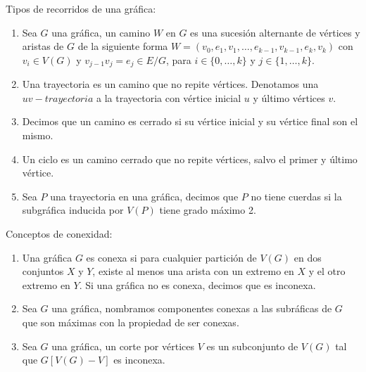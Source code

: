 \begin{definicion} Tipos de recorridos de una gr\'afica:
    \label{def:tipos de recorridos}
    \begin{enumerate}
        \item Sea $G$ una gr\'afica, un camino $W$ en $G$ es una sucesi\'on
        alternante de v\'ertices y aristas de $G$ de la siguiente forma
        $W=(v_0, e_1,v_1, \dots, e_{k-1},v_{k-1}, e_k,v_k)$ con $v_i \in
        V(G)$ y $v_{j-1}v_j = e_j \in E/G$, para $i \in \{0, \dots, k\}$ y
        $j \in \{ 1, \dots, k\}$.
        \item Una trayectoria es un camino que no repite v\'ertices.
        Denotamos una $uv-\textit{trayectoria}$ a la trayectoria con
        v\'ertice inicial $u$ y \'ultimo v\'ertices $v$.
        \item Decimos que un camino es cerrado si su v\'ertice inicial y su
        v\'ertice final son el mismo.
        \item Un ciclo es un camino cerrado que no repite v\'ertices, salvo
        el primer y \'ultimo v\'ertice.
        \item Sea $P$ una trayectoria en una gr\'afica, decimos que $P$ no
        tiene cuerdas si la subgr\'afica inducida por $V(P)$ tiene grado
        m\'aximo 2.
    \end{enumerate}
\end{definicion}

\begin{definicion} Conceptos de conexidad:
    \label{def:conexidad}
    \begin{enumerate}    
        \item Una gr\'afica $G$ es conexa si para cualquier partici\'on de
        $V(G)$ en dos conjuntos $X$ y $Y$, existe al menos una arista con un
        extremo en $X$ y el otro extremo en $Y$. Si una gr\'afica no es
        conexa, decimos que es inconexa.
        \item Sea $G$ una gr\'afica, nombramos componentes conexas a las
        subr\'aficas de $G$ que son m\'aximas con la propiedad de ser
        conexas.
        \item Sea $G$ una gr\'afica, un corte por v\'ertices $V$ es un
        subconjunto de $V(G)$ tal que $G[V(G)-V]$ es inconexa.
    \end{enumerate}
\end{definicion}

